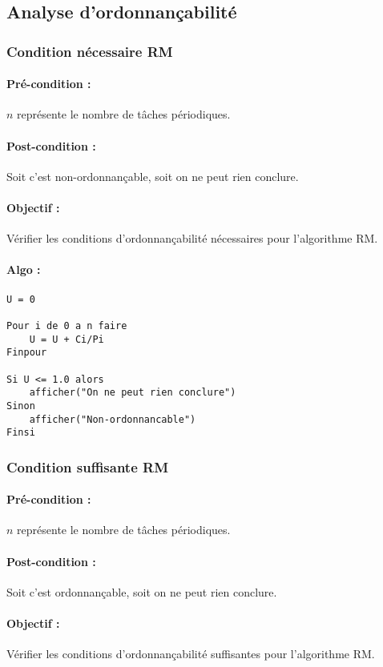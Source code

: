 		
		\subsection{Analyse d'ordonnançabilité}
			
			\subsubsection{Condition nécessaire RM}
				\paragraph{Pré-condition :} $n$ représente le nombre de tâches périodiques.
				\paragraph{Post-condition :} Soit c'est non-ordonnançable, soit on ne peut rien conclure.
				\paragraph{Objectif :} Vérifier les conditions d'ordonnançabilité nécessaires pour l'algorithme RM.
				\paragraph{Algo :} 
					\begin{lstlisting}
U = 0
					
Pour i de 0 a n faire
	U = U + Ci/Pi
Finpour		

Si U <= 1.0 alors
	afficher("On ne peut rien conclure")
Sinon
	afficher("Non-ordonnancable")
Finsi
					\end{lstlisting}
			
			\subsubsection{Condition suffisante RM}
				\paragraph{Pré-condition :} $n$ représente le nombre de tâches périodiques.
				\paragraph{Post-condition :} Soit c'est ordonnançable, soit on ne peut rien conclure.
				\paragraph{Objectif :} Vérifier les conditions d'ordonnançabilité suffisantes pour l'algorithme RM.
